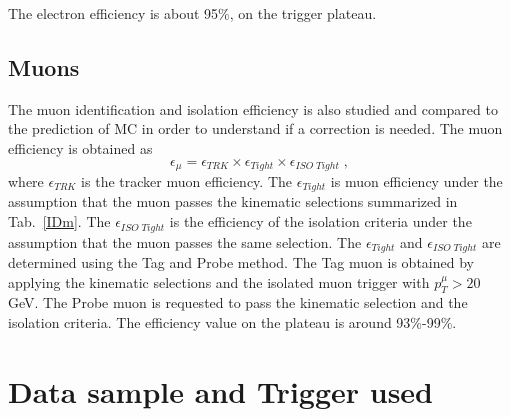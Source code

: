 The electron efficiency is about 95\%, on the trigger plateau. 


\subsection*{Muons} 
The muon identification and isolation efficiency is also studied and compared to the prediction of MC in order
to understand if a correction is needed. The muon efficiency is obtained as
\begin{equation}
\epsilon_{\mu} = \epsilon_{TRK} \times \epsilon_{Tight} \times \epsilon_{ISO \; Tight} \; ,
\end{equation}
\newline
where $ \epsilon_{TRK}$ is the tracker  muon efficiency.  
The $ \epsilon_{Tight} $ is muon efficiency
under the assumption that the muon passes the kinematic selections summarized in  Tab.~\ref{IDm}.
The $\epsilon_{ISO \; Tight}$ is the efficiency of the isolation criteria under the assumption that the muon passes the same selection.
The $\epsilon_{Tight}$ and $ \epsilon_{ISO \; Tight}$ are determined  using the Tag and Probe method. 
The Tag muon is obtained by applying  the kinematic selections  and   the isolated muon trigger  with $p_T^{\mu}>20$ GeV.
The Probe muon  is requested to pass the kinematic selection and the isolation criteria.
The efficiency value on the plateau is around 93\%-99\%.



\section{Data sample and Trigger used}

